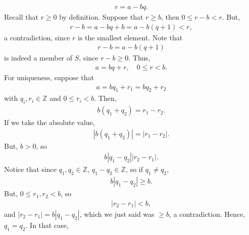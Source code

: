 \documentclass{report}
\begin{document}
\begin{itemize}
            \begin{align*}
                r = a - bq 
            .\end{align*}
            Recall that $r \geq 0$ by definition. Suppose that $r \geq b$, then $0 \leq r- b < r$. But,
            \begin{align*}
                r - b = a - bq + b = a - b(q+1) < r
            ,\end{align*}
            a contradiction, since $r$ is the smallest element. Note that 
            \begin{align*}
                 r - b = a - b(q+1)
            \end{align*}
            is indeed a member of $S$, since $r-b \geq 0$. Thus, 
            \begin{align*}
                a = bq + r,\quad 0 \leq r < b
            .\end{align*}
            For uniqueness, suppose that 
            \begin{align*}
                a = bq_{1} + r_{1} = bq_{2} + r_{2}
            \end{align*}
            with $q_{i}, r_{i} \in \mathbb{Z}$ and $0 \leq r_{i} < b$. Then, 
            \begin{align*}
                b(q_{1} + q_{2}) = r_{1} - r_{2}
            .\end{align*}
            If we take the absolute value,
            \begin{align*}
                \left\lvert b(q_{1} + q_{2}) \right\rvert = \left\lvert r_{1} - r_{2} \right\rvert
            .\end{align*}
            But, $b > 0$, so
            \begin{align*}
                b\left\lvert q_{1} - q_{2} \right\rvert \left\lvert r_{2} - r_{1} \right\rvert
            .\end{align*}
            Notice that since $q_{1}, q_{2} \in \mathbb{Z}$, $q_{1} - q_{2} \in \mathbb{Z}$, so if $q_{1} \ne q_{2}$,
            \begin{align*}
                b \left\lvert q_{1} - q_{2} \right\rvert \geq b
            .\end{align*}
            But, $0 \leq r_{1}, r_{2} < b$, so 
            \begin{align*}
               \left\lvert r_{2} - r_{1} \right\rvert < b
            ,\end{align*}
            and $\left\lvert r_{2} - r_{1} \right\rvert  = b \left\lvert q_{1} - q_{2} \right\rvert$, which we just said was $ \geq b$, a contradiction. Hence, $q_{1} = q_{2}$. In that case,

\end{itemize}
\end{document}
